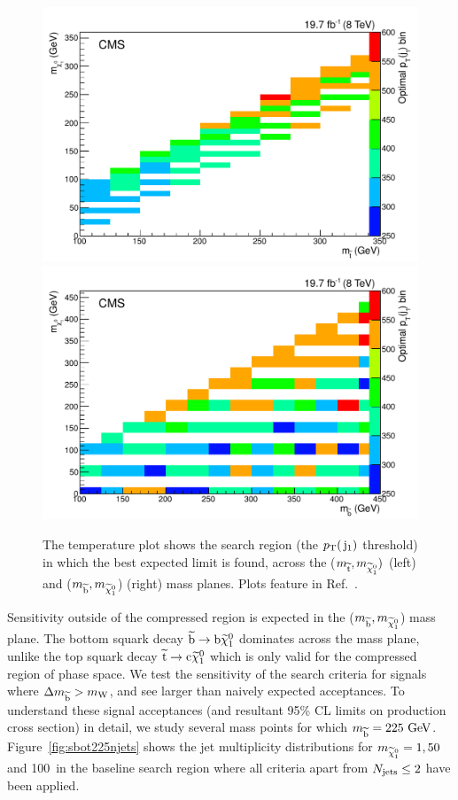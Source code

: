 \begin{figure}[!Hhtb]
  \begin{center}
  \includegraphics[scale=0.39]{Figures/sus13009/limitplots/optimal_stop_jet1pT.pdf}
  \includegraphics[scale=0.39]{Figures/sus13009/limitplots/optimal_sbottom_jet1pT.pdf}
  \caption{The temperature plot shows the search region (the $p_{\text{T}}(\,\mathrm{j}_1)$ threshold) in which the best expected limit is found, across the ($m_{\widetilde{{\rm t}}}, m_{\widetilde{\chi}^{0}_{1}})$ (left) and ($m_{\widetilde{{\rm b}}},m_{\widetilde{\chi}^{0}_{1}}$) (right) mass planes. Plots feature in Ref.~\cite{sus14001}.}
  \label{fig:optimalJ1}
  \end{center}
\end{figure}

Sensitivity outside of the compressed region is expected in the ($m_{\widetilde{{\rm b}}}, m_{\widetilde{\chi}^{0}_{1}}$) mass plane. 
The bottom squark decay $\widetilde{{\rm b}} \rightarrow {\rm b} \widetilde{\chi}^{0}_{1}$ dominates across the mass plane, 
unlike the top squark decay $\widetilde{{\rm t}} \rightarrow {\rm c} \widetilde{\chi}^{0}_{1}$ which is only valid for the compressed region of phase space.
We test the sensitivity of the search criteria for signals where $\Delta m_{\widetilde{{\rm b}}}>m_{\mathrm{W}}$, and see larger than naively expected acceptances. 
To understand these signal acceptances (and resultant 95\% \ac{CL} limits on production cross section) in detail, we study several mass points for which $m_{\widetilde{{\rm b}}}=225~\mathrm{GeV}$. 
Figure~\ref{fig:sbot225njets} shows the jet multiplicity distributions for $m_{\widetilde{\chi}^{0}_{1}}=1,50$ and 100~\GeV in the baseline search region where all criteria apart from $N_{\text{jets}}\leq2$ have been applied.  


